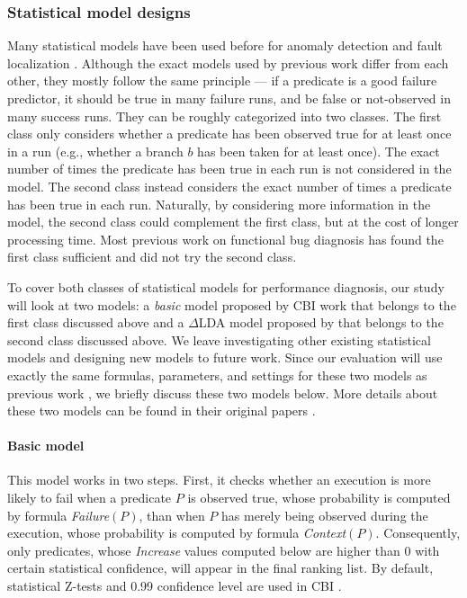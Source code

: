 \subsubsection{Statistical model designs}
Many statistical models have been used before for anomaly 
detection \citep{engler01bugs,CPMiner04,kremenek06inferring,lamsigsoft02} 
and fault localization 
\citep{liblit03,liblit05,CCI,tarantula1,tarantula2,tarantula.darko,Delta-LDA}.
Although the exact models used by previous work differ from each other, they 
mostly follow the same principle --- if a predicate is a good failure predictor,
it should be true in many failure runs, and be false or not-observed
in many success runs. They can be roughly categorized into two classes.
The first class
only considers whether a predicate has been observed
true for at least once in a run (e.g., whether a branch $b$ has been
taken for at least once). The exact number of times the predicate has
been true in each run is not considered in the model.
The second class instead considers the exact number of times a predicate has 
been true in each run.
Naturally, by considering more information in the model, the second class could
complement the first class, but at the cost of longer processing time.
Most previous work on functional bug
diagnosis has found the first class sufficient 
\cite{liblit03,liblit05,CCI,joy.asplos13} and did not try 
the second class.

To cover both classes of statistical models for performance diagnosis, our 
study will look at two models: a
\emph{basic} model proposed by CBI work \citep{liblit03,liblit05} that belongs
to the first class discussed above 
and a $\Delta$LDA model proposed by \citet{Delta-LDA} that belongs
to the second class discussed above. 
We leave investigating other existing statistical
models and designing new models to future work. Since our evaluation will use
exactly the same formulas, parameters, and settings
for these two models as previous work \citep{liblit03,liblit05,Delta-LDA}, we
briefly discuss these two models below.
More details about these two models can be found in their
original papers \citep{liblit03,liblit05, Delta-LDA}. 

\paragraph{Basic model}
This model works in two steps.
First, it checks whether an execution is more likely to fail 
when a predicate $P$ is observed true, 
whose probability is computed by formula \textit{Failure}$(P)$, 
than when $P$ has merely being observed during the execution, 
whose probability is computed by formula \textit{Context}$(P)$.
Consequently, only predicates, whose \textit{Increase} values computed below
are higher than 0 with
certain statistical confidence, will appear in the final ranking list.
By default, statistical Z-tests and 0.99 confidence level are 
used in CBI \cite{liblit03}.

